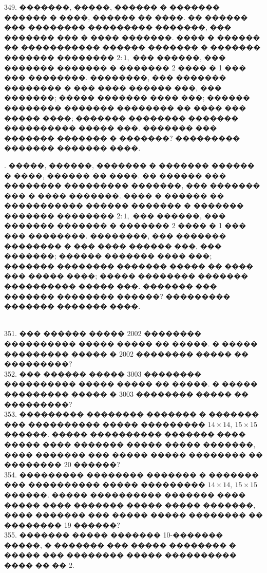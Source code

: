 \documentclass[12pt]{article}
\begin{document}
349. �������, �����, ������ � ������� ������ � ����, ������ �� ����. �� ������ ��� �������� ��������� �������, ��� ������� ��� � ���� �������. ���� � ������ �� ����������� ������ ������� � ������� ������� �������� $2:1,$ ��� ������, ��� ������� ������� � ������� 2 ���� � 1 ��� ��� ��������. ��������, ��� ������� �������� � ��� ���� ������ ���, ��� �������; ����� ������� ���� ���; ������ �������� ������� �������� �� ���� ��� ����� ����; ������� �������� ������� ���������� ����� ���. ������� ��� ������� ������� � �������? ��������� ������� ������� ����.\\
\begin{figure}[ht!]
\end{figure}\newpage{}. �����, ������, ������� � ������� ������ � ����, ������ �� ����. �� ������ ��� �������� ��������� �������, ��� ������� ��� � ���� �������. ���� � ������ �� ����������� ������ ������� � ������� ������� �������� $2:1,$ ��� ������, ��� ������� ������� � ������� 2 ���� � 1 ��� ��� ��������. ��������, ��� ������� �������� � ��� ���� ������ ���, ��� �������; ������ ������� ���� ���; ������� �������� ������� ����� �� ���� ��� ����� ����; ����� �������� ������� ���������� ����� ���. ������� ��� ������� �������� ������? ��������� ������� ������� ����.\\
\begin{figure}[ht!]
\end{figure}\\
351. ��� ������ ����� 2002 �������� ���������� ����� ����� �� �����. � ����� ��������� ����� � 2002 �������� ����� �� ���������?\\
352. ��� ������ ����� 3003 �������� ���������� ����� ����� �� �����. � ����� ��������� �����
� 3003 �������� ����� �� ���������?\\
353. ��������� �������� ������� � ������� ��� ���������� ����� ��������� $14 \times 14,\ 15 \times 15$ ������. ����� ���������� ������� ���� ����� ���� ������� ����� ����� �������, ���� ������� ��� ����� ����� �������� �� �������� 20 ������?\\
354. ��������� �������� ������� � ������� ��� ���������� ����� ��������� $14 \times 14,\ 15 \times 15$ ������. ����� ���������� ������� ���� ����� ���� ������� ����� ����� �������, ���� ������� ��� ����� ����� �������� �� �������� 19 ������?\\
355. ������� ����� ������� 10-������� �����, � ������� ��� ����� �������� � ����� ��� �������� ����� ���������� ���� �� �� 2.\\
\end{document}
